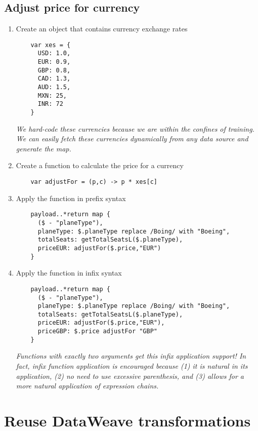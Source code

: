 \subsection{Adjust price for currency}
\begin{enumerate}[resume*]
\item Create an object that contains currency exchange rates
  \begin{verbatim}
    var xes = {
      USD: 1.0,
      EUR: 0.9,
      GBP: 0.8,
      CAD: 1.3,
      AUD: 1.5,
      MXN: 25,
      INR: 72
    }
  \end{verbatim}
  \emph{
    We hard-code these currencies because we are within the confines of training.  We can easily fetch these
    currencies dynamically from any data source and generate the map.
  }
\item Create a function to calculate the price for a currency
  \begin{verbatim}
    var adjustFor = (p,c) -> p * xes[c]
  \end{verbatim}
\item Apply the function in prefix syntax
  \begin{verbatim}
    payload..*return map {
      ($ - "planeType"),
      planeType: $.planeType replace /Boing/ with "Boeing",
      totalSeats: getTotalSeatsL($.planeType),
      priceEUR: adjustFor($.price,"EUR")
    }
  \end{verbatim}
\item Apply the function in infix syntax
  \begin{verbatim}
    payload..*return map {
      ($ - "planeType"),
      planeType: $.planeType replace /Boing/ with "Boeing",
      totalSeats: getTotalSeatsL($.planeType),
      priceEUR: adjustFor($.price,"EUR"),
      priceGBP: $.price adjustFor "GBP"
    }    
  \end{verbatim}
  \emph{
    Functions with exactly two arguments get this infix application support!  In fact, infix function
    application is encouraged because (1) it is natural in its application, (2) no need to use excessive
    parenthesis, and (3) allows for a more natural application of expression chains.
  }
\end{enumerate}

\section{Reuse DataWeave transformations}

